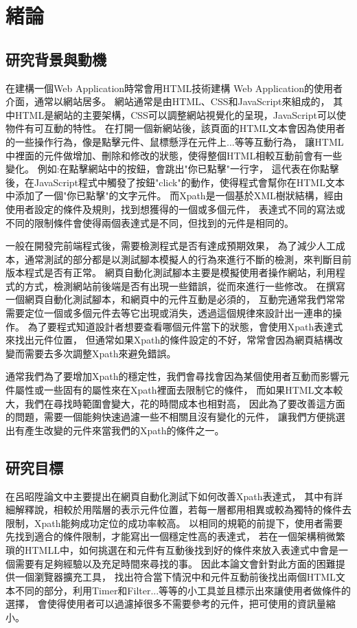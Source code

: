 \chapter{緒論}
\section{研究背景與動機}
\indent
在建構一個Web Application時常會用HTML技術建構 Web Application的使用者介面，通常以網站居多。
網站通常是由HTML、CSS和JavaScript來組成的，
其中HTML是網站的主要架構，CSS可以調整網站視覺化的呈現，JavaScript可以使物件有可互動的特性。
在打開一個新網站後，該頁面的HTML文本會因為使用者的一些操作行為，像是點擊元件、鼠標懸浮在元件上...等等互動行為，
讓HTML中裡面的元件做增加、刪除和修改的狀態，使得整個HTML相較互動前會有一些變化。
例如:在點擊網站中的按鈕，會跳出"你已點擊"一行字，
這代表在你點擊後，在JavaScript程式中觸發了按鈕"click"的動作，使得程式會幫你在HTML文本中添加了一個"你已點擊"的文字元件。
而Xpath是一個基於XML樹狀結構，經由使用者設定的條件及規則，找到想獲得的一個或多個元件，
表達式不同的寫法或不同的限制條件會使得兩個表達式是不同，但找到的元件是相同的。

\indent
一般在開發完前端程式後，需要檢測程式是否有達成預期效果，
為了減少人工成本，通常測試的部分都是以測試腳本模擬人的行為來進行不斷的檢測，來判斷目前版本程式是否有正常。
網頁自動化測試腳本主要是模擬使用者操作網站，利用程式的方式，檢測網站前後端是否有出現一些錯誤，從而來進行一些修改。
在撰寫一個網頁自動化測試腳本，和網頁中的元件互動是必須的，
互動完通常我們常常需要定位一個或多個元件去等它出現或消失，透過這個規律來設計出一連串的操作。
為了要程式知道設計者想要查看哪個元件當下的狀態，會使用Xpath表達式來找出元件位置，
但通常如果Xpath的條件設定的不好，常常會因為網頁結構改變而需要去多次調整Xpath來避免錯誤。

\indent
通常我們為了要增加Xpath的穩定性，我們會尋找會因為某個使用者互動而影響元件屬性或一些固有的屬性來在Xpath裡面去限制它的條件，
而如果HTML文本較大，我們在尋找時範圍會變大，花的時間成本也相對高，
因此為了要改善這方面的問題，需要一個能夠快速過濾一些不相關且沒有變化的元件，
讓我們方便挑選出有產生改變的元件來當我們的Xpath的條件之一。

\section{研究目標}
\indent
在呂昭陞論文中主要提出在網頁自動化測試下如何改善Xpath表達式，
其中有詳細解釋說，相較於用階層的表示元件位置，若每一層都用相異或較為獨特的條件去限制，Xpath能夠成功定位的成功率較高。
以相同的規範的前提下，使用者需要先找到適合的條件限制，才能寫出一個穩定性高的表達式，
若在一個架構稍微繁瑣的HTMLL中，如何挑選在和元件有互動後找到好的條件來放入表達式中會是一個需要有足夠經驗以及充足時間來尋找的事。
因此本論文會針對此方面的困難提供一個瀏覽器擴充工具，
找出符合當下情況中和元件互動前後找出兩個HTML文本不同的部分，利用Timer和Filter...等等的小工具並且標示出來讓使用者做條件的選擇，
會使得使用者可以過濾掉很多不需要參考的元件，把可使用的資訊量縮小。

